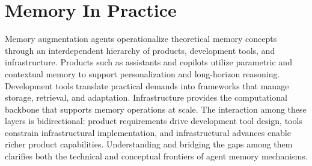 \documentclass[manuscript,screen]{acmart}
\begin{document}
\section{Memory In Practice}
\label{sec:memory_practice}

Memory augmentation agents operationalize theoretical memory concepts through an interdependent hierarchy of products, development tools, and infrastructure. Products such as assistants and copilots utilize parametric and contextual memory to support personalization and long-horizon reasoning. Development tools translate practical demands into frameworks that manage storage, retrieval, and adaptation. Infrastructure provides the computational backbone that supports memory operations at scale. The interaction among these layers is bidirectional: product requirements drive development tool design, tools constrain infrastructural implementation, and infrastructural advances enable richer product capabilities. Understanding and bridging the gaps among them clarifies both the technical and conceptual frontiers of agent memory mechanisms.
\end{document}
